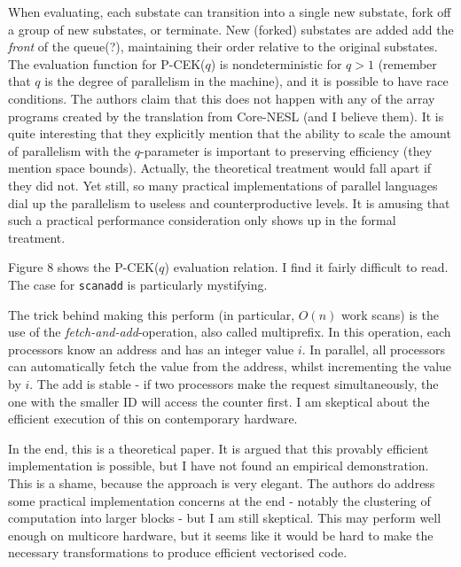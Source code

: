 \documentclass[a4paper, oneside, final]{memoir}
\begin{document}
When evaluating, each substate can transition into a single new
substate, fork off a group of new substates, or terminate.  New
(forked) substates are added add the \textit{front} of the queue(?),
maintaining their order relative to the original substates.  The
evaluation function for P-CEK($q$) is nondeterministic for $q > 1$
(remember that $q$ is the degree of parallelism in the machine), and
it is possible to have race conditions.  The authors claim that this
does not happen with any of the array programs created by the
translation from Core-NESL (and I believe them).  It is quite
interesting that they explicitly mention that the ability to scale the
amount of parallelism with the $q$-parameter is important to
preserving efficiency (they mention space bounds).  Actually, the
theoretical treatment would fall apart if they did not.  Yet still, so
many practical implementations of parallel languages dial up the
parallelism to useless and counterproductive levels.  It is amusing
that such a practical performance consideration only shows up in the
formal treatment.

Figure 8 shows the P-CEK($q$) evaluation relation.  I find it fairly
difficult to read.  The case for \texttt{scanadd} is particularly
mystifying.

The trick behind making this perform (in particular, $O(n)$ work
scans) is the use of the \textit{fetch-and-add}-operation, also called
multiprefix.  In this operation, each processors know an address and
has an integer value $i$.  In parallel, all processors can
automatically fetch the value from the address, whilst incrementing
the value by $i$.  The add is stable - if two processors make the
request simultaneously, the one with the smaller ID will access the
counter first.  I am skeptical about the efficient execution of this
on contemporary hardware.

In the end, this is a theoretical paper.  It is argued that this
provably efficient implementation is possible, but I have not found an
empirical demonstration.  This is a shame, because the approach is
very elegant.  The authors do address some practical implementation
concerns at the end - notably the clustering of computation into
larger blocks - but I am still skeptical.  This may perform well
enough on multicore hardware, but it seems like it would be hard to
make the necessary transformations to produce efficient vectorised
code.
\end{document}

